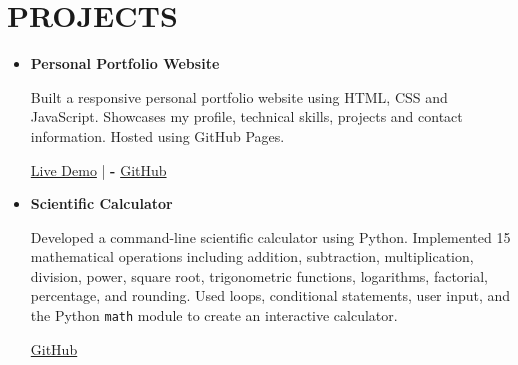 \documentclass{resume}
\begin{document}

\section{PROJECTS}{\small}
\begin{itemize}

\item \textbf{Personal Portfolio Website}
{\footnotesize

Built a responsive personal portfolio website using HTML, CSS and JavaScript.
Showcases my profile, technical skills, projects and contact information. Hosted using GitHub Pages.

\href{https://adwaaaiith.github.io/Portfolio/}{Live Demo} | \textbf{-}
\href{https://github.com/adwaaaiith/Portfolio}{GitHub}
}

\vspace{0.4cm}

\item \textbf{Scientific Calculator}
{\footnotesize

Developed a command-line scientific calculator using Python.
Implemented 15 mathematical operations including addition, subtraction, multiplication, division, power, square root, trigonometric functions, logarithms, factorial, percentage, and rounding.
Used loops, conditional statements, user input, and the Python \texttt{math} module to create an interactive calculator.

\href{https://github.com/adwaaaiith/Portfolio/blob/main/calculator.py}{GitHub}
}

\end{itemize}
    
    
        
\end{document}
